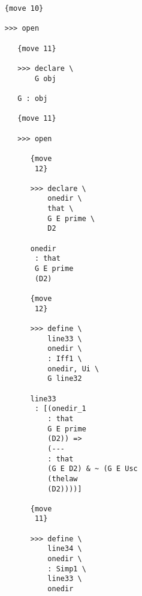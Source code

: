 \documentclass[12pt]{article}
\begin{document}
\begin{verbatim}
                              {move 10}

                              >>> open

                                 {move 11}

                                 >>> declare \
                                     G obj

                                 G : obj

                                 {move 11}

                                 >>> open

                                    {move 
                                     12}

                                    >>> declare \
                                        onedir \
                                        that \
                                        G E prime \
                                        D2

                                    onedir 
                                     : that 
                                     G E prime 
                                     (D2)

                                    {move 
                                     12}

                                    >>> define \
                                        line33 \
                                        onedir \
                                        : Iff1 \
                                        onedir, Ui \
                                        G line32

                                    line33 
                                     : [(onedir_1 
                                        : that 
                                        G E prime 
                                        (D2)) => 
                                        (--- 
                                        : that 
                                        (G E D2) & ~ (G E Usc 
                                        (thelaw 
                                        (D2))))]

                                    {move 
                                     11}

                                    >>> define \
                                        line34 \
                                        onedir \
                                        : Simp1 \
                                        line33 \
                                        onedir


\end{verbatim}
\end{document}
